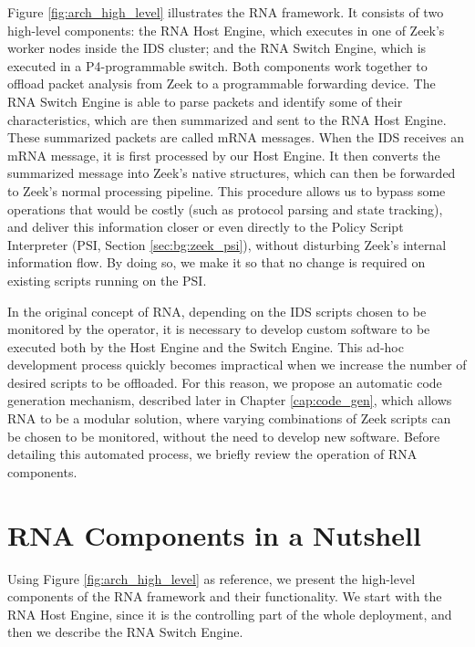Figure \ref{fig:arch_high_level} illustrates the RNA framework. It consists of two high-level components: the RNA Host Engine, which executes in one of Zeek's worker nodes inside the IDS cluster; and the RNA Switch Engine, which is executed in a P4-programmable switch. Both components work together to offload packet analysis from Zeek to a programmable forwarding device. The RNA Switch Engine is able to parse packets and identify some of their characteristics, which are then summarized and sent to the RNA Host Engine. These summarized packets are called mRNA messages. When the IDS receives an mRNA message, it is first processed by our Host Engine. It then converts the summarized message into Zeek's native structures, which can then be forwarded to Zeek's normal processing pipeline. This procedure allows us to bypass some operations that would be costly (such as protocol parsing and state tracking), and deliver this information closer or even directly to the Policy Script Interpreter (PSI, Section \ref{sec:bg:zeek_psi}), without disturbing Zeek's internal information flow. By doing so, we make it so that no change is required on existing scripts running on the PSI.

In the original concept of RNA, depending on the IDS scripts chosen to be monitored by the operator, it is necessary to develop custom software to be executed both by the Host Engine and the Switch Engine. This ad-hoc development process quickly becomes impractical when we increase the number of desired scripts to be offloaded. For this reason, we propose an automatic code generation mechanism, described later in Chapter \ref{cap:code_gen}, which allows RNA to be a modular solution, where varying combinations of Zeek scripts can be chosen to be monitored, without the need to develop new software. Before detailing this automated process, we briefly review the operation of RNA components.

\section{RNA Components in a Nutshell}
\label{sec:rna:overview}

Using Figure \ref{fig:arch_high_level} as reference, we present the high-level components of the RNA framework and their functionality. We start with the RNA Host Engine, since it is the controlling part of the whole deployment, and then we describe the RNA Switch Engine.

